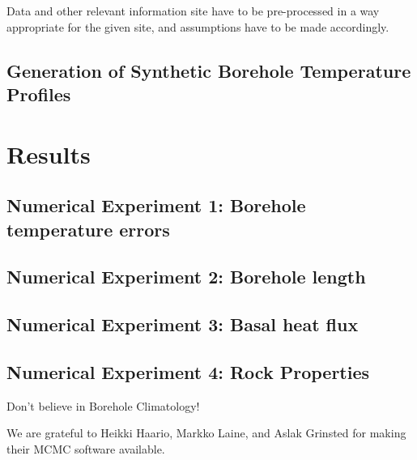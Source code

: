 \documentclass[cp]{copernicus}
\begin{document}
Data and other relevant information site have to be pre-processed in a way appropriate for the 
given 
site, and assumptions have to be made accordingly. 

\subsection{Generation of Synthetic Borehole Temperature Profiles}

\section{Results}
\subsection{Numerical Experiment 1: Borehole temperature errors}\label{sec:errors}
\subsection{Numerical Experiment 2: Borehole length}\label{sec:length}
\subsection{Numerical Experiment 3: Basal heat flux}\label{sec:qb}
\subsection{Numerical Experiment 4: Rock Properties}\label{sec:props}


\conclusions %
Don't believe in Borehole Climatology!






\begin{acknowledgements}
We are grateful to Heikki Haario, Markko Laine, and Aslak Grinsted for making their MCMC software 
available. 
\end{acknowledgements}
\end{document}
